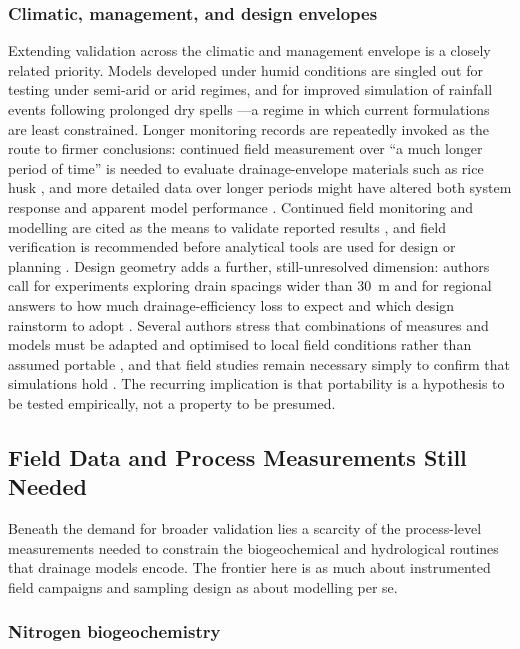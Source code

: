 \subsubsection{Climatic, management, and design envelopes}

Extending validation across the climatic and management envelope is a closely related priority. Models developed under humid conditions are singled out for testing under semi-arid or arid regimes, and for improved simulation of rainfall events following prolonged dry spells \parencite{Prasher1996}---a regime in which current formulations are least constrained. Longer monitoring records are repeatedly invoked as the route to firmer conclusions: continued field measurement over ``a much longer period of time'' is needed to evaluate drainage-envelope materials such as rice husk \parencite{Ebrahimian2011}, and more detailed data over longer periods might have altered both system response and apparent model performance \parencite{Negm2017}. Continued field monitoring and modelling are cited as the means to validate reported results \parencite{Grazhdani1996}, and field verification is recommended before analytical tools are used for design or planning \parencite{Hornbuckle2012}. Design geometry adds a further, still-unresolved dimension: authors call for experiments exploring drain spacings wider than 30~m \parencite{Mathew2001} and for regional answers to how much drainage-efficiency loss to expect and which design rainstorm to adopt \parencite{Wiskow2003}. Several authors stress that combinations of measures and models must be adapted and optimised to local field conditions rather than assumed portable \parencite{MULLER1988}, and that field studies remain necessary simply to confirm that simulations hold \parencite{Shipitalo2016,Yousfi2014}. The recurring implication is that portability is a hypothesis to be tested empirically, not a property to be presumed.

\subsection{Field Data and Process Measurements Still Needed}

Beneath the demand for broader validation lies a scarcity of the process-level measurements needed to constrain the biogeochemical and hydrological routines that drainage models encode. The frontier here is as much about instrumented field campaigns and sampling design as about modelling per se.

\subsubsection{Nitrogen biogeochemistry}

